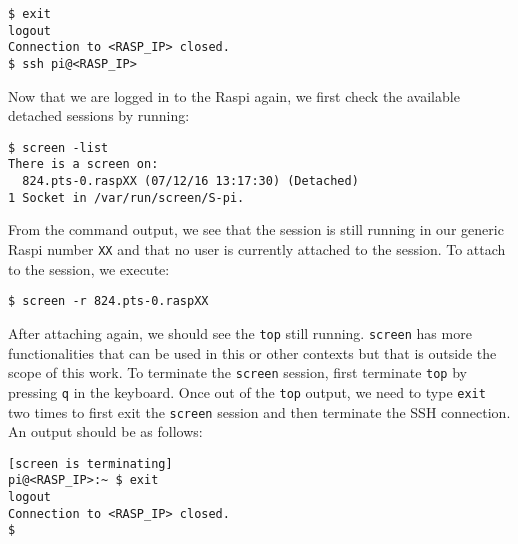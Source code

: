 \begin{lstlisting}[]
$ exit
logout
Connection to <RASP_IP> closed.
$ ssh pi@<RASP_IP>
\end{lstlisting}
\FloatBarrier
\vspace{-5mm}

Now that we are logged in to the \ac{Raspi} again, we first check the
available detached sessions by running:
\begin{lstlisting}[]
$ screen -list
There is a screen on:
  824.pts-0.raspXX (07/12/16 13:17:30) (Detached)
1 Socket in /var/run/screen/S-pi.
\end{lstlisting}
\FloatBarrier
\vspace{-5mm}

From the command output, we see that the session is still running in our
generic \ac{Raspi} number \texttt{XX} and that no user is currently attached
to the session. To attach to the session, we execute:

\begin{lstlisting}[]
$ screen -r 824.pts-0.raspXX
\end{lstlisting}
\FloatBarrier
\vspace{-5mm}

After attaching again, we should see the \texttt{top} still running.
\texttt{screen} has more functionalities that can be used in this
or other contexts but that is outside the scope of this work.
To terminate the \texttt{screen} session, first terminate \texttt{top}
by pressing \texttt{q} in the keyboard. Once out of the \texttt{top}
output, we need to type \texttt{exit} two times to first exit the
\texttt{screen} session and then terminate the \ac{SSH} connection.
An output should be as follows:


\begin{lstlisting}[]
[screen is terminating]
pi@<RASP_IP>:~ $ exit
logout
Connection to <RASP_IP> closed.
$
\end{lstlisting}
\FloatBarrier
\vspace{-5mm}

